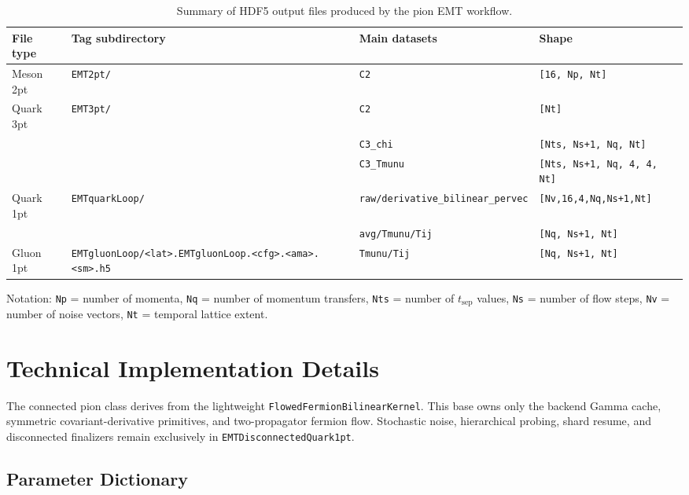 \documentclass[11pt,a4paper]{article}
\newcommand{\code}[1]{\texttt{#1}}
\begin{document}
\begin{table}[h]
\centering
\caption{Summary of HDF5 output files produced by the pion EMT workflow.}
\label{tab:hdf5}
\begin{tabular}{@{}llll@{}}
\toprule
\textbf{File type} & \textbf{Tag subdirectory} & \textbf{Main datasets} & \textbf{Shape} \\
\midrule
Meson 2pt     & \code{EMT2pt/}  & \code{C2}          & \code{[16, Np, Nt]} \\
Quark 3pt     & \code{EMT3pt/}  & \code{C2}          & \code{[Nt]} \\
              &                  & \code{C3\_chi}      & \code{[Nts, Ns+1, Nq, Nt]} \\
              &                  & \code{C3\_Tmunu}    & \code{[Nts, Ns+1, Nq, 4, 4, Nt]} \\
Quark 1pt     & \code{EMTquarkLoop/}    & \code{raw/derivative\_bilinear\_pervec} & \code{[Nv,16,4,Nq,Ns+1,Nt]} \\
              &                  & \code{avg/Tmunu/Tij}    & \code{[Nq, Ns+1, Nt]} \\
Gluon 1pt       & \code{EMTgluonLoop/<lat>.EMTgluonLoop.<cfg>.<ama>.<sm>.h5} & \code{Tmunu/Tij} & \code{[Nq, Ns+1, Nt]} \\
\bottomrule
\end{tabular}
\end{table}

Notation: \code{Np} = number of momenta, \code{Nq} = number of momentum transfers, \code{Nts} = number of $t_{\text{sep}}$ values, \code{Ns} = number of flow steps, \code{Nv} = number of noise vectors, \code{Nt} = temporal lattice extent.

\section{Technical Implementation Details}
The connected pion class derives from the lightweight
\texttt{FlowedFermionBilinearKernel}. This base owns only the backend Gamma
cache, symmetric covariant-derivative primitives, and two-propagator fermion
flow. Stochastic noise, hierarchical probing, shard resume, and disconnected
finalizers remain exclusively in \texttt{EMTDisconnectedQuark1pt}.

\subsection{Parameter Dictionary}
\label{sec:parameters}
\end{document}
